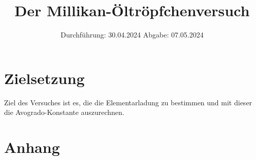 

\subject{V503}
\title{Der Millikan-Öltröpfchenversuch}
\date{%
  Durchführung: 30.04.2024
  \hspace{3em}
  Abgabe: 07.05.2024
}



\maketitle
\thispagestyle{empty}
\tableofcontents
\newpage

\section{Zielsetzung}
Ziel des Versuches ist es, die die Elementarladung zu bestimmen und mit dieser die Avogrado-Konstante auszurechnen.






\printbibliography{}

\section{Anhang}


